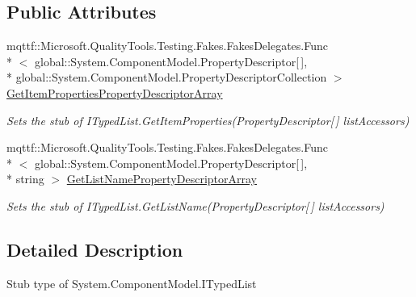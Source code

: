 \subsection*{Public Attributes}
\begin{DoxyCompactItemize}
\item 
mqttf\-::\-Microsoft.\-Quality\-Tools.\-Testing.\-Fakes.\-Fakes\-Delegates.\-Func\\*
$<$ global\-::\-System.\-Component\-Model.\-Property\-Descriptor\mbox{[}$\,$\mbox{]}, \\*
global\-::\-System.\-Component\-Model.\-Property\-Descriptor\-Collection $>$ \hyperlink{class_system_1_1_component_model_1_1_fakes_1_1_stub_i_typed_list_aa024f4685fc7f0b3af1d971ea7758d48}{Get\-Item\-Properties\-Property\-Descriptor\-Array}
\begin{DoxyCompactList}\small\item\em Sets the stub of I\-Typed\-List.\-Get\-Item\-Properties(\-Property\-Descriptor\mbox{[}$\,$\mbox{]} list\-Accessors)\end{DoxyCompactList}\item 
mqttf\-::\-Microsoft.\-Quality\-Tools.\-Testing.\-Fakes.\-Fakes\-Delegates.\-Func\\*
$<$ global\-::\-System.\-Component\-Model.\-Property\-Descriptor\mbox{[}$\,$\mbox{]}, \\*
string $>$ \hyperlink{class_system_1_1_component_model_1_1_fakes_1_1_stub_i_typed_list_a57c1d2dfc2decb8b8d1612718a383bac}{Get\-List\-Name\-Property\-Descriptor\-Array}
\begin{DoxyCompactList}\small\item\em Sets the stub of I\-Typed\-List.\-Get\-List\-Name(\-Property\-Descriptor\mbox{[}$\,$\mbox{]} list\-Accessors)\end{DoxyCompactList}\end{DoxyCompactItemize}


\subsection{Detailed Description}
Stub type of System.\-Component\-Model.\-I\-Typed\-List



